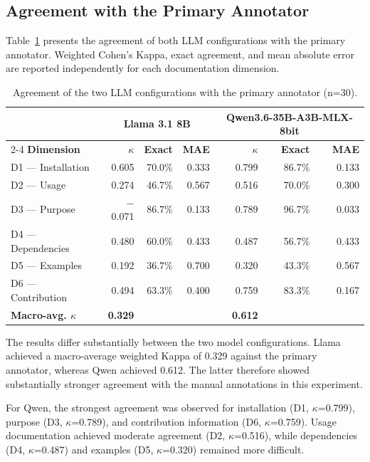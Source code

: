\subsection{Agreement with the Primary Annotator}

Table~\ref{tab:llm_a1} presents the agreement of both LLM
configurations with the primary annotator. Weighted Cohen's Kappa,
exact agreement, and mean absolute error are reported independently
for each documentation dimension.

\begin{table}[htbp]
\centering
\caption{Agreement of the two LLM configurations with the primary
annotator (n=30).}
\label{tab:llm_a1}
\small
\begin{tabular}{lrrrrrr}
\hline
& \multicolumn{3}{c}{\textbf{Llama 3.1 8B}}
& \multicolumn{3}{c}{\textbf{Qwen3.6-35B-A3B-MLX-8bit}} \\
\cline{2-4}\cline{5-7}
\textbf{Dimension}
& \textbf{$\kappa$} & \textbf{Exact} & \textbf{MAE}
& \textbf{$\kappa$} & \textbf{Exact} & \textbf{MAE} \\
\hline
D1 --- Installation
& 0.605 & 70.0\% & 0.333
& 0.799 & 86.7\% & 0.133 \\
D2 --- Usage
& 0.274 & 46.7\% & 0.567
& 0.516 & 70.0\% & 0.300 \\
D3 --- Purpose
& $-$0.071 & 86.7\% & 0.133
& 0.789 & 96.7\% & 0.033 \\
D4 --- Dependencies
& 0.480 & 60.0\% & 0.433
& 0.487 & 56.7\% & 0.433 \\
D5 --- Examples
& 0.192 & 36.7\% & 0.700
& 0.320 & 43.3\% & 0.567 \\
D6 --- Contribution
& 0.494 & 63.3\% & 0.400
& 0.759 & 83.3\% & 0.167 \\
\hline
\textbf{Macro-avg. $\kappa$}
& \textbf{0.329} & & 
& \textbf{0.612} & & \\
\hline
\end{tabular}
\end{table}

The results differ substantially between the two model
configurations. Llama achieved a macro-average weighted Kappa of
0.329 against the primary annotator, whereas Qwen achieved 0.612.
The latter therefore showed substantially stronger agreement with
the manual annotations in this experiment.

For Qwen, the strongest agreement was observed for installation
(D1, $\kappa$=0.799), purpose (D3, $\kappa$=0.789), and contribution
information (D6, $\kappa$=0.759). Usage documentation achieved
moderate agreement (D2, $\kappa$=0.516), while dependencies
(D4, $\kappa$=0.487) and examples (D5, $\kappa$=0.320) remained
more difficult.

